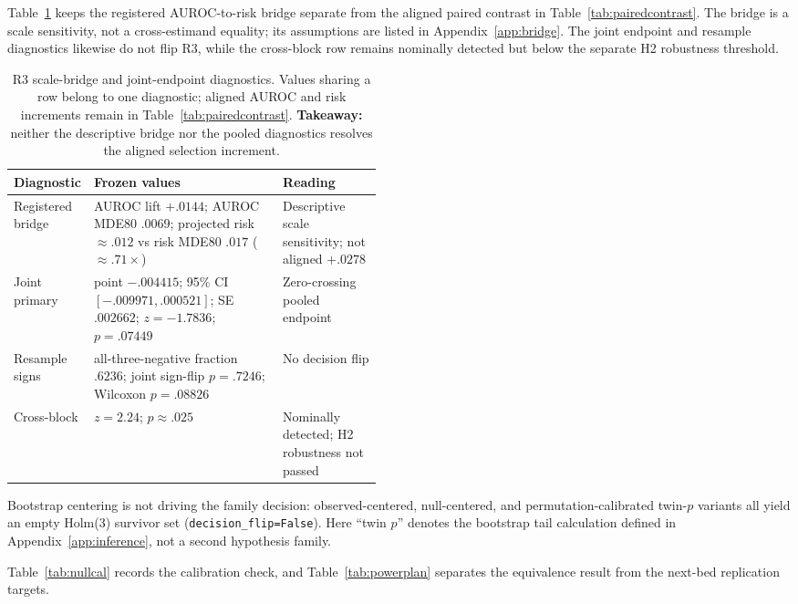 \documentclass{article}
\begin{document}
Table~\ref{tab:r3diagnostics} keeps the registered AUROC-to-risk bridge separate from the
aligned paired contrast in Table~\ref{tab:pairedcontrast}.  The bridge is a scale sensitivity,
not a cross-estimand equality; its assumptions are listed in Appendix~\ref{app:bridge}.
The joint endpoint and resample diagnostics likewise do not flip R3, while the cross-block
row remains nominally detected but below the separate H2 robustness threshold.

\begin{table}[t]
\caption{R3 scale-bridge and joint-endpoint diagnostics.  Values sharing a row belong to one
diagnostic; aligned AUROC and risk increments remain in Table~\ref{tab:pairedcontrast}.
\textbf{Takeaway:} neither the descriptive bridge nor the pooled diagnostics resolves the
aligned selection increment.}
\label{tab:r3diagnostics}
\centering\footnotesize
\setlength{\tabcolsep}{4pt}
\begin{tabularx}{\linewidth}{@{}>{\raggedright\arraybackslash}p{0.20\linewidth}>{\raggedright\arraybackslash}X>{\raggedright\arraybackslash}p{0.27\linewidth}@{}}
\toprule
Diagnostic & Frozen values & Reading \\
\midrule
Registered bridge & AUROC lift $+.0144$; AUROC MDE80 $.0069$; projected risk $\approx.012$ vs risk MDE80 $.017$ ($\approx.71\times$) & Descriptive scale sensitivity; not aligned $+.0278$ \\
Joint primary & point $-.004415$; 95\% CI $[-.009971,.000521]$; SE $.002662$; $z=-1.7836$; $p=.07449$ & Zero-crossing pooled endpoint \\
Resample signs & all-three-negative fraction $.6236$; joint sign-flip $p=.7246$; Wilcoxon $p=.08826$ & No decision flip \\
Cross-block & $z=2.24$; $p\approx.025$ & Nominally detected; H2 robustness not passed \\
\bottomrule
\end{tabularx}
\end{table}

Bootstrap centering is not driving the family decision: observed-centered, null-centered, and
permutation-calibrated twin-$p$ variants all yield an empty Holm(3) survivor set
(\texttt{decision\_flip=False}).  Here ``twin $p$'' denotes the bootstrap tail calculation
defined in Appendix~\ref{app:inference}, not a second hypothesis family.

Table~\ref{tab:nullcal} records the calibration check, and Table~\ref{tab:powerplan} separates
the equivalence result from the next-bed replication targets.
\end{document}
